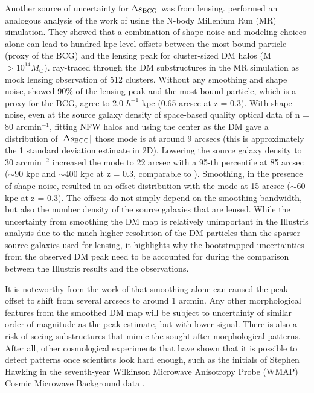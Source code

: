 Another source of uncertainty for $\Delta s_{\rm BCG}$ was from lensing. 
\cite{Dietrich2012} performed an analogous analysis of the work of \cite{Oguri2010} 
using the N-body Millenium Run (MR) simulation.
They showed that a combination of shape noise and modeling choices 
alone can lead to hundred-kpc-level offsets between the most bound particle 
(proxy of the BCG) and the lensing peak for cluster-sized DM halos 
(M $> 10^{14 }M_\odot$).  
\cite{Dietrich2012} ray-traced through the DM substructures in the MR simulation 
as mock lensing observation of 512 clusters.  
Without any smoothing and shape noise, \cite{Dietrich2012} showed 
90\% of the lensing peak and the 
most bound particle, which is a proxy for the BCG, agree to 2.0 $h^{-1}$ kpc
(0.65 arcsec at z = 0.3). 
With shape noise,
even at the source galaxy density of space-based quality optical data of n = 80
arcmin$^{-1}$, fitting NFW halos and using the center as the DM gave a 
distribution of $|\Delta s_{\rm BCG}|$ those mode is at around 9 arcsecs (this is
approximately the 1 standard deviation estimate in 2D). 
Lowering the source galaxy density to 30 arcmin$^{-2}$ increased the mode
to 22 arcsec with a 95-th percentile at 85 arcsec 
($\sim 90$ kpc and $\sim 400$ kpc at z = 0.3, comparable to \citealt{Oguri2010}). 
Smoothing, in the presence of shape noise,
resulted in an offset distribution with the mode at
15 arcsec ($\sim 60$ kpc at z = 0.3). 
The offsets do not simply depend on the smoothing bandwidth, 
but also the number density of the source galaxies that are lensed. 
While the uncertainty from smoothing the DM map is
relatively unimportant in the Illustris analysis due to the much higher resolution 
of the DM particles than the sparser source galaxies used for lensing, it
highlights why the bootstrapped uncertainties from the observed
DM peak need to be accounted for during the comparison between the
Illustris results and the observations.

It is noteworthy from the work of \cite{Dietrich2012} that 
smoothing alone can caused the peak offset to shift from several arcsecs to
around 1 arcmin.
Any other morphological features from the smoothed DM map will be subject 
to uncertainty of similar order of magnitude as the peak
estimate, but with lower signal. 
There is also a risk of seeing substructures that mimic the sought-after 
morphological patterns. After all, other cosmological experiments 
that have shown
that it is possible to detect patterns once scientists look hard enough, 
such as the initials of Stephen
Hawking in the seventh-year Wilkinson Microwave Anisotropy Probe (WMAP) 
Cosmic Microwave Background data \citep{Bennett2011}.

